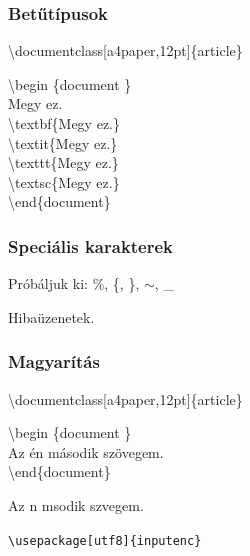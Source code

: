 \documentclass[t,aspectratio=169]{beamer}
\begin{document}

\begin{frame}
\frametitle{Betűtípusok}

\textbackslash documentclass[a4paper,12pt]\{article\}

\textbackslash begin \{document \}\\
Megy ez.\\
\textbackslash textbf\{Megy ez.\}\\
\textbackslash textit\{Megy ez.\}\\
\textbackslash texttt\{Megy ez.\}\\
\textbackslash textsc\{Megy ez.\}\\
\textbackslash end\{document\}
\end{frame}


\begin{frame}
\frametitle{Speciális karakterek}

Próbáljuk ki: \%, \{, \}, $\sim$, \_

Hibaüzenetek.
\vfill
\end{frame}


\begin{frame}
\frametitle{Magyarítás}

\textbackslash documentclass[a4paper,12pt]\{article\}

\textbackslash begin \{document \}\\
Az én második szövegem.\\
\textbackslash end\{document\}

\textrm{Az n msodik szvegem.}

\texttt{\textbackslash usepackage[utf8]\{inputenc\}}
\end{frame}

\end{document}
